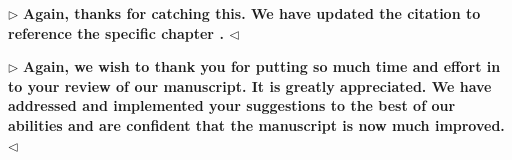 \documentclass[12pt]{article}
\newenvironment{reply}{$\triangleright$\bfseries}{$\triangleleft$}
\renewenvironment{quote}
               {\list{}{\rightmargin\leftmargin}%
                \item\relax\normalfont}
               {\endlist}
\newcommand{\ttheta}{\boldsymbol{\theta}}
\begin{document}
\begin{reply}
	Again, thanks for catching this.  We have updated the citation to reference the specific chapter \cite{norris_1997}.
\end{reply}


\begin{reply}
	Again, we wish to thank you for putting so much time and effort in to your review of our manuscript.  It is greatly appreciated.  We have addressed and implemented your suggestions to the best of our abilities and are confident that the manuscript is now much improved.
\end{reply}

%
%
%
%
%
%
%
\end{document}

